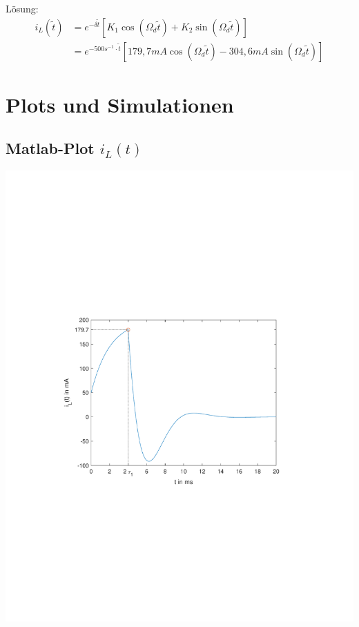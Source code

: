 \documentclass[11pt]{scrartcl}
\begin{document}
Lösung:
\begin{align*}
  i_{L}(\tilde{t}) &= e^{-\delta \tilde{t}}\left[ K_{1} \cos(\Omega_{d} \tilde{t}) + K_{2} \sin(\Omega_{d} \tilde{t}) \right] \\
  &= e^{-500 s^{-1} \cdot  \tilde{t}}\left[ 179,7 \unit{mA} \cos(\Omega_{d} \tilde{t}) - 304,6 \unit{mA} \sin(\Omega_{d} \tilde{t}) \right]
\end{align*}
\section{Plots und Simulationen} %
\subsection{Matlab-Plot $i_L(t)$} %

\begin{center}

  \includegraphics[width=0.70\linewidth]{./Assets/ML_Strom_Plot.pdf}
  \label{fig:ML_Strom_Plot}
\end{center}
\end{document}
